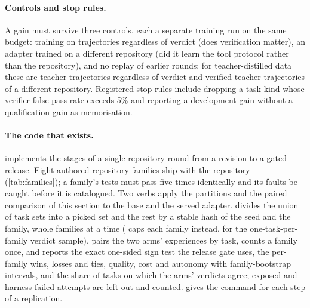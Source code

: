 \paragraph{Controls and stop rules.} A gain must survive three controls, each a separate
training run on the same budget: training on trajectories regardless of verdict (does
verification matter), an adapter trained on a different repository (did it learn the tool
protocol rather than the repository), and no replay of earlier rounds; for teacher-distilled data these are teacher trajectories
regardless of verdict and verified teacher trajectories of a different repository. Registered
stop rules include dropping a task kind whose verifier false-pass rate exceeds 5\% and reporting
a development gain without a qualification gain as memorisation.

\paragraph{The code that exists.}  implements the stages of a
single-repository round from a revision to a gated release. Eight authored repository
families ship with the repository (\cref{tab:families}); a family's tests must pass five times
identically and its faults be caught before it is catalogued. Two verbs apply the partitions and the paired comparison of this section to the base and the
served adapter.
 divides the union of task sets
into a picked set and the rest by a stable hash of the seed and the family, whole families at a
time ( caps each family instead, for the one-task-per-family verdict
sample).  pairs the two arms' experiences
by task, counts a family once, and reports the exact one-sided sign test the release gate uses,
the per-family wins, losses and ties, quality, cost and autonomy with family-bootstrap
intervals, and the share of tasks on which the arms' verdicts agree; exposed and harness-failed
attempts are left out and counted.  gives the command for each step of a replication.
